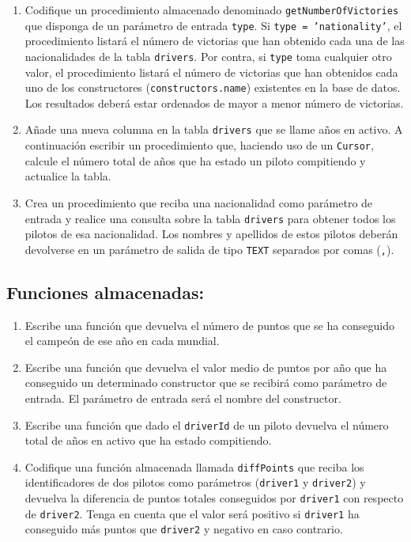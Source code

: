 \documentclass{db-practice}
\begin{document}
\begin{enumerate}
    \item Codifique un procedimiento almacenado denominado \texttt{getNumberOfVictories} que disponga de un parámetro de entrada \texttt{type}. Si \texttt{type = 'nationality'}, el procedimiento listará el número de victorias que han obtenido cada una de las nacionalidades de la tabla \texttt{drivers}. Por contra, si \texttt{type} toma cualquier otro valor, el procedimiento listará el número de victorias que han obtenidos cada uno de los constructores (\texttt{constructors.name}) existentes en la base de datos. Los resultados deberá estar ordenados de mayor a menor número de victorias.
    
    \item Añade una nueva columna en la tabla \texttt{drivers} que se llame años en activo. A continuación escribir un procedimiento que, haciendo uso de un \texttt{Cursor}, calcule el número total de años que ha estado un piloto compitiendo y actualice la tabla.

    \item Crea un procedimiento que reciba una nacionalidad como parámetro de entrada y realice una consulta sobre la tabla \texttt{drivers} para obtener todos los pilotos de esa nacionalidad. Los nombres y apellidos de estos pilotos deberán devolverse en un parámetro de salida de tipo \texttt{TEXT} separados por comas (\texttt{,}).
\end{enumerate}

\subsection*{Funciones almacenadas:}

\begin{enumerate}
    \item Escribe una función que devuelva el número de puntos que se ha conseguido el campeón de ese año en cada mundial.
       
    \item Escribe una función que devuelva el valor medio de puntos por año que ha conseguido un determinado constructor que se recibirá como parámetro de entrada. El parámetro de entrada será el nombre del constructor.
            
    \item Escribe una función que dado el \texttt{driverId} de un piloto devuelva el número total de años en activo que ha estado compitiendo.

    \item Codifique una función almacenada llamada \texttt{diffPoints} que reciba los identificadores de dos pilotos como parámetros (\texttt{driver1} y \texttt{driver2}) y devuelva la diferencia de puntos totales conseguidos por \texttt{driver1} con respecto de \texttt{driver2}. Tenga en cuenta que el valor será positivo si \texttt{driver1} ha conseguido más puntos que \texttt{driver2} y negativo en caso contrario.
\end{enumerate}
\end{document}
